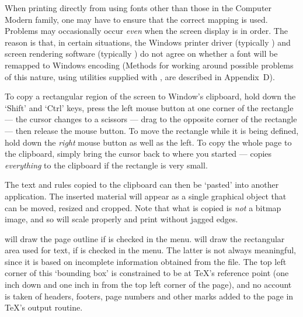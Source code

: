 
When printing directly from {\DVIWindo} 
using fonts other than those in the Computer Modern family,
one may have to ensure that the correct mapping is used.
Problems may occasionally occur {\it even\/} when the 
screen display is in order. 
The reason is that, in certain situations,
the Windows printer driver (typically {\PSCRIPT}) and 
screen rendering software (typically {\ATM})
do not agree on whether a font will be remapped
to Windows {\ANSI} encoding %
(Methods for working around possible problems of this nature,
using utilities supplied with
{\DVIWindo}, are described in Appendix~D).



To copy a rectangular region of the screen to Window's clipboard,
hold down the `Shift' and `Ctrl' keys, press the left
mouse button at one corner of the rectangle --- the cursor changes to 
a scissors --- drag to the opposite corner of the rectangle --- then
release the mouse button.  To move the rectangle while it is being
defined, hold down the {\it right} mouse button as well as the left.
To copy the whole page to the clipboard, simply bring the
cursor back to where you started --- {\DVIWindo} copies
{\it everything\/} to the clipboard if the rectangle is very small.

The text and rules copied to the clipboard can then be `pasted' 
into another application.  The inserted material will appear as 
a single graphical object that can be moved, resized and cropped.
Note that what is copied is {\it not} a bitmap image, and so will
scale properly and print without jagged edges.


{\DVIWindo} will draw the page outline if 
 is checked in the  menu.
{\DVIWindo} will draw the rectangular area %
used for text,
if  is checked in the  menu.
The latter is not always meaningful, 
since it is based on incomplete information obtained from the {\DVI} file.
The top left corner of this `bounding box' is %
constrained to be at {\TeX}'s reference point  
(one inch down and one inch in from the top left corner of the page),
and no account is taken of headers, footers,
page numbers and other marks 
added to the page in {\TeX}'s output routine.

